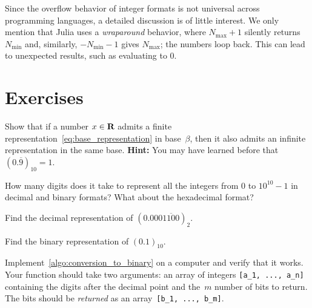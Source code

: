 Since the overflow behavior of integer formats is not universal across programming languages,
a detailed discussion is of little interest.
We only mention that Julia uses a \emph{wraparound} behavior,
where $N_{\max} + 1$ silently returns $N_{\min}$ and,
similarly, $-N_{\min} - 1$ gives $N_{\max}$;
the numbers loop back.
This can lead to unexpected results,
such as  evaluating to 0.

\section{Exercises}
\begin{exercise}
    \label{exercise:non_unique_representation}
    Show that if a number $x \in \mathbf R$ admits a finite representation~\eqref{eq:base_representation} in base~$\beta$,
    then it also admits an infinite representation in the same base.
    \textbf{Hint:} You may have learned before that $(0.\overline 9)_{10} = 1$.
\end{exercise}

\begin{exercise}
    How many digits does it take to represent all the integers from 0 to $10^{10} - 1$ in decimal and binary formats?
    What about the hexadecimal format?
\end{exercise}

\begin{exercise}
    Find the decimal representation of $(0.000\overline{1100})_2$.
\end{exercise}

\begin{exercise}
    \label{exercise:binary_zero_point_one}
    Find the binary representation of $(0.1)_{10}$.
\end{exercise}

\begin{compexercise}
    Implement~\cref{algo:conversion_to_binary} on a computer and verify that it works.
    Your function should take two arguments: an array of integers \verb?[a_1, ..., a_n]? containing the digits after the decimal point
    and the~$m$ number of bits to return.
    The bits should be \emph{returned} as an array~\verb?[b_1, ..., b_m]?.
\end{compexercise}

